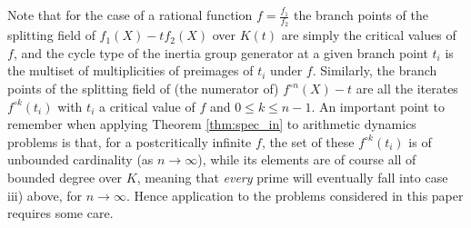 \documentclass[a4paper]{amsart}
\begin{document}
  Note that for the case of a rational function $f=\frac{f_1}{f_2}$ the branch points of the splitting field of $f_1(X)-tf_2(X)$ over $K(t)$ are simply the critical values of $f$, and the cycle type of the inertia group generator at a given branch point $t_i$ is the multiset of multiplicities of preimages of $t_i$ under $f$. Similarly, the branch points of the splitting field of (the numerator of) $f^{\circ n}(X)-t$ are all the iterates $f^{\circ k}(t_i)$ with $t_i$ a critical value of $f$ and $0\le k\le n-1$. An important point to remember when applying Theorem \ref{thm:spec_in} to arithmetic dynamics problems is that, for a postcritically infinite $f$, the set of these $f^{\circ k}(t_i)$ is of unbounded cardinality (as $n\to \infty$), while its elements are of course all of bounded degree over $K$, meaning that {\it every} prime will eventually fall into case iii) above, for $n\to \infty$. Hence application to the problems considered in this paper requires some care. 
  
\end{document}
